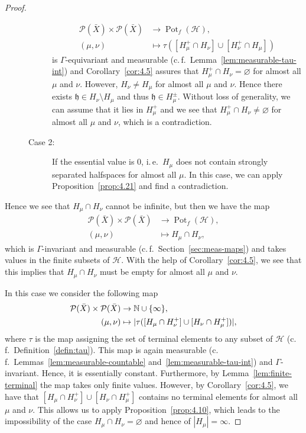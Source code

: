\begin{proof}
\begin{description}
\begin{description}
      \begin{align*}
        \mathcal{P}(\bar X) \times \mathcal{P}(\bar X) &\to \operatorname{Pot}_f(\mathcal{H}),\\
        (\mu,\nu) &\mapsto \tau([H_\mu^+ \cap H_\nu] \cup [H_\nu^+ \cap H_\mu])
      \end{align*}
      is \(\Gamma\)-equivariant and measurable (c.\,f.\ Lemma~\ref{lem:measurable-tau-int}) and Corollary~\ref{cor:4.5} assures that \(H_\mu^+ \cap H_\nu = \varnothing\) for almost all \(\mu\) and \(\nu\). However, \(H_\nu \neq H_\mu\) for almost all \(\mu\) and \(\nu\). Hence there exists \(\mathfrak{h} \in H_\nu \setminus H_\mu\) and thus \(\mathfrak{h} \in H_\mu^\pm\). Without loss of generality, we can assume that it lies in \(H_\mu^+\) and we see that \(H_\mu^+ \cap H_\nu \neq \varnothing\) for almost all \(\mu\) and \(\nu\), which is a contradiction.
    \item[Case 2:] If the essential value is 0, i.\,e.\ \(H_\mu\) does not contain strongly separated halfspaces for almost all \(\mu\). In this case, we can apply Proposition~\ref{prop:4.21} and find a contradiction.
    \end{description}
  \end{description}
  Hence we see that \(H_\mu \cap H_\nu\) cannot be infinite, but then we have the map
  \begin{align*}
    \mathcal{P}(\bar X) \times \mathcal{P}(\bar X) & \to \operatorname{Pot}_f(\mathcal{H}),\\
    (\mu,\nu) &\mapsto H_\mu \cap H_\nu,
  \end{align*}
  which is \(\Gamma\)-invariant and measurable (c.\,f.~Section~\ref{sec:meas-maps}) and takes values in the finite subsets of \(\mathcal{H}\). With the help of Corollary~\ref{cor:4.5}, we see that this implies that \(H_\mu \cap H_\nu\) must be empty for almost all \(\mu\) and \(\nu\).

  In this case we consider the following map
  \begin{align*}
    \mathcal{P}(\bar X) \times \mathcal{P}(\bar X) &\to \mathbb{N} \cup \{\infty\},\\
    (\mu, \nu) &\mapsto |\tau([H_\mu \cap H_\nu^+] \cup [H_\nu \cap H_\mu^+])|,
  \end{align*}
  where \(\tau\) is the map assigning the set of terminal elements to any subset of \(\mathcal{H}\) (c.\,f.~Definition~\ref{defin:tau}). This map is again measurable (c.\,f.\ Lemmas~\ref{lem:measurable-countable} and~\ref{lem:measurable-tau-int}) and \(\Gamma\)-invariant. Hence, it is essentially constant. Furthermore, by Lemma~\ref{lem:finite-terminal} the map takes only finite values. However, by Corollary~\ref{cor:4.5}, we have that \([H_\mu \cap H_\nu^+] \cup [H_\nu \cap H_\mu^+]\) contains no terminal elements for almost all \(\mu\) and \(\nu\). This allows us to apply Proposition~\ref{prop:4.10}, which leads to the impossibility of the case \(H_\mu \cap H_\nu = \varnothing\) and hence of \(|H_\mu| = \infty\). 
\end{proof}

